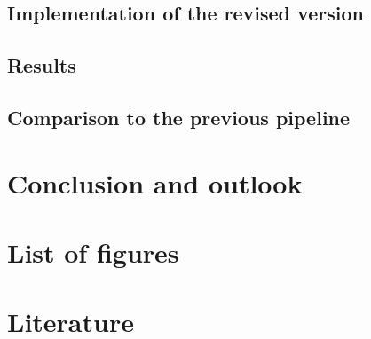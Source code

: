 \documentclass[english]{ttlab-qualify}
\begin{document}
\section{Implementation of the revised version}
\section{Results}
\section{Comparison to the previous pipeline}

\chapter{Conclusion and outlook}
\chapter{List of figures}
\chapter{Literature}

\appendix
\printbibliography
\end{document}
